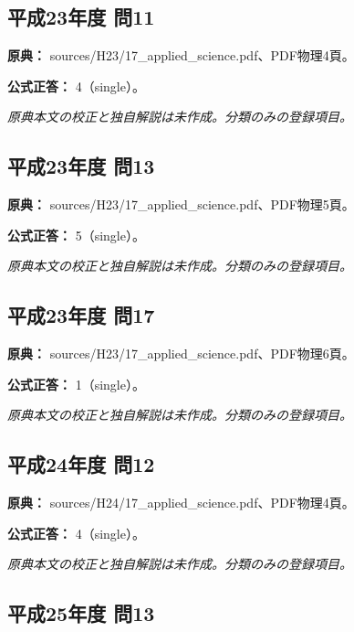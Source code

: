 \subsection{平成23年度 問11}
\label{q:h23-reg-applied-11}

\noindent\textbf{原典：} sources/H23/17\_applied\_science.pdf、PDF物理4頁。

\textbf{公式正答：} 4（single）。

\par\textit{原典本文の校正と独自解説は未作成。分類のみの登録項目。}

\subsection{平成23年度 問13}
\label{q:h23-reg-applied-13}

\noindent\textbf{原典：} sources/H23/17\_applied\_science.pdf、PDF物理5頁。

\textbf{公式正答：} 5（single）。

\par\textit{原典本文の校正と独自解説は未作成。分類のみの登録項目。}

\subsection{平成23年度 問17}
\label{q:h23-reg-applied-17}

\noindent\textbf{原典：} sources/H23/17\_applied\_science.pdf、PDF物理6頁。

\textbf{公式正答：} 1（single）。

\par\textit{原典本文の校正と独自解説は未作成。分類のみの登録項目。}

\subsection{平成24年度 問12}
\label{q:h24-reg-applied-12}

\noindent\textbf{原典：} sources/H24/17\_applied\_science.pdf、PDF物理4頁。

\textbf{公式正答：} 4（single）。

\par\textit{原典本文の校正と独自解説は未作成。分類のみの登録項目。}

\subsection{平成25年度 問13}
\label{q:h25-reg-applied-13}

